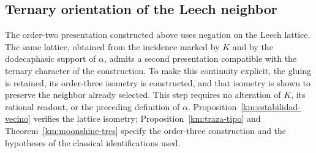 
\subsection{Ternary orientation of the Leech neighbor}
\label{km:orden-tres-reticular}

The order-two presentation constructed above uses negation on the Leech
lattice. The same lattice, obtained from the incidence marked by \(K\)
and by the dodecaphasic support of \(\alpha\), admits a second
presentation compatible with the ternary character of the construction.
To make this continuity explicit, the gluing is retained, its order-three
isometry is constructed, and that isometry is shown to preserve the
neighbor already selected. This step requires no alteration of \(K\),
its rational readout, or the preceding definition of \(\alpha\).
Proposition~\ref{km:estabilidad-vecino} verifies the lattice isometry;
Proposition~\ref{km:traza-tipo} and Theorem~\ref{km:moonshine-tres}
specify the order-three construction and the hypotheses of the
classical identifications used.

